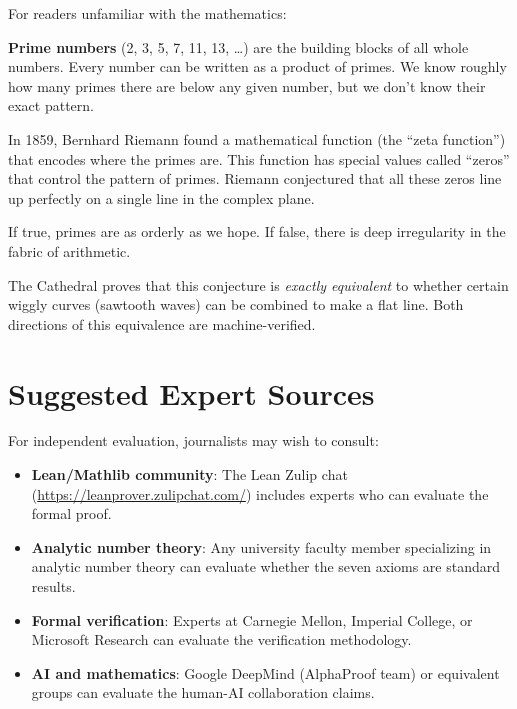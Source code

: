 \documentclass[11pt,a4paper]{article}
\begin{document}
For readers unfamiliar with the mathematics:

\textbf{Prime numbers} (2, 3, 5, 7, 11, 13, \ldots) are the
building blocks of all whole numbers. Every number can be written
as a product of primes. We know roughly how many primes there are
below any given number, but we don't know their exact pattern.

In 1859, Bernhard Riemann found a mathematical function (the
``zeta function'') that encodes where the primes are. This function
has special values called ``zeros'' that control the pattern of
primes. Riemann conjectured that all these zeros line up perfectly
on a single line in the complex plane.

If true, primes are as orderly as we hope. If false, there is
deep irregularity in the fabric of arithmetic.

The Cathedral proves that this conjecture is \emph{exactly
equivalent} to whether certain wiggly curves (sawtooth waves) can
be combined to make a flat line. Both directions of this equivalence
are machine-verified.

\section{Suggested Expert Sources}

For independent evaluation, journalists may wish to consult:

\begin{itemize}
  \item \textbf{Lean/Mathlib community}: The Lean Zulip chat
    (\url{https://leanprover.zulipchat.com/}) includes experts
    who can evaluate the formal proof.

  \item \textbf{Analytic number theory}: Any university faculty
    member specializing in analytic number theory can evaluate
    whether the seven axioms are standard results.

  \item \textbf{Formal verification}: Experts at Carnegie Mellon,
    Imperial College, or Microsoft Research can evaluate the
    verification methodology.

  \item \textbf{AI and mathematics}: Google DeepMind (AlphaProof
    team) or equivalent groups can evaluate the human-AI
    collaboration claims.
\end{itemize}
\end{document}
